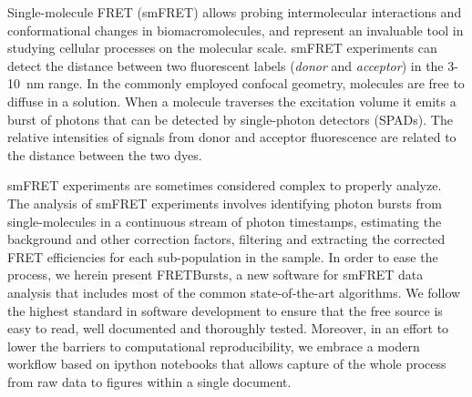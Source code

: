 Single-molecule FRET (smFRET) allows probing intermolecular interactions and conformational changes in biomacromolecules, and represent an invaluable tool in studying cellular processes on the molecular scale\cite{Kapanidis_2006}. smFRET
experiments can detect the distance between two fluorescent labels (\textit{donor} and \textit{acceptor}) in the 
3-10~nm range. In the commonly employed confocal geometry, molecules are free to diffuse in a solution. When a molecule traverses the excitation volume it emits a burst of photons that can be detected by single-photon detectors (SPADs). 
The relative intensities of signals from donor and acceptor fluorescence are related to the distance between the two dyes.

smFRET experiments are sometimes considered complex to properly analyze. The analysis of smFRET experiments involves identifying photon bursts from single-molecules in a continuous stream of photon timestamps, estimating the background and other correction factors, filtering and extracting the corrected FRET efficiencies for each sub-population in the sample. In order to ease the process, we herein present FRETBursts, a new software for smFRET data analysis that includes most of the common state-of-the-art algorithms. We follow the highest standard in software development to ensure that the free source is easy to read, well documented and thoroughly tested. Moreover, in an effort to lower the barriers to computational reproducibility, we embrace a modern workflow based on ipython notebooks that allows capture of the whole process from raw data to figures within a single document.
